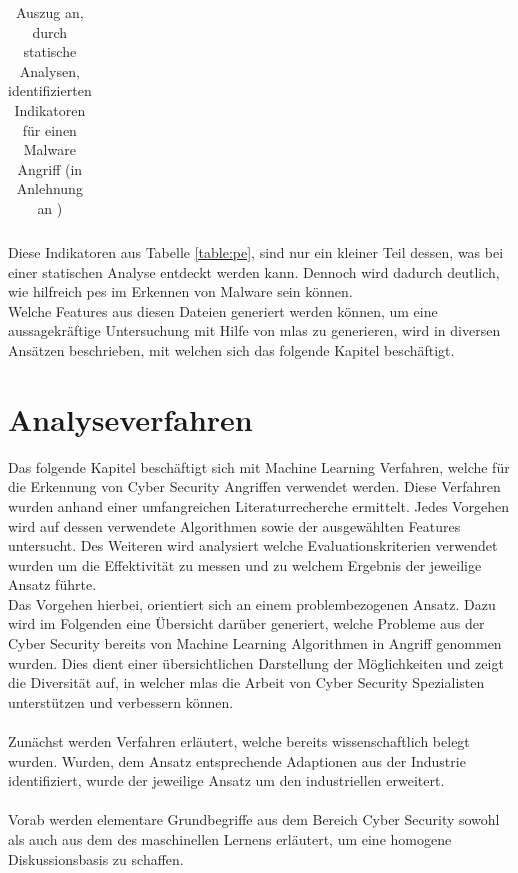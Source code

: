 \documentclass[
    12pt, %
    DIV10,
    ngerman, %
    a4paper, %
    oneside, %
    titlepage, %
    parskip=half, %
    headings=normal, %
    listof=totoc, %
    bibliography=totoc, %
    index=totoc, %
    captions=tableheading, %
    final %
]{scrreprt}
\begin{document}
\begin{table}[H]
\begin{tabular}{lll}
\end{tabular}
\caption{Auszug an, durch statische Analysen, identifizierten Indikatoren für einen Malware Angriff (in Anlehnung an \textcite{Sikorski2012})}\label{table:pe}
Diese Indikatoren aus Tabelle \ref{table:pe}, sind nur ein kleiner Teil dessen, was bei einer statischen Analyse entdeckt werden kann. Dennoch wird dadurch deutlich, wie hilfreich \ac{pes} im Erkennen von Malware sein können.\\ 
Welche Features aus diesen Dateien generiert werden können, um eine aussagekräftige Untersuchung mit Hilfe von \ac{mlas} zu generieren, wird in diversen Ansätzen beschrieben, mit welchen sich das folgende Kapitel beschäftigt.
\label{tab:iocs}
\end{table}
\chapter{Analyseverfahren}
\label{sec:ba}
Das folgende Kapitel beschäftigt sich mit Machine Learning Verfahren, welche für die Erkennung von Cyber Security Angriffen verwendet werden. Diese Verfahren wurden anhand einer umfangreichen Literaturrecherche ermittelt. Jedes Vorgehen wird auf dessen verwendete Algorithmen sowie der ausgewählten Features untersucht. Des Weiteren wird analysiert welche Evaluationskriterien verwendet wurden um die Effektivität zu messen und zu welchem Ergebnis der jeweilige Ansatz führte.\\
Das Vorgehen hierbei, orientiert sich an einem problembezogenen Ansatz. Dazu wird im Folgenden eine Übersicht darüber generiert, welche Probleme aus der Cyber Security bereits von Machine Learning Algorithmen in Angriff genommen wurden. Dies dient einer übersichtlichen Darstellung der Möglichkeiten und zeigt die Diversität auf, in welcher \ac{mlas} die Arbeit von Cyber Security Spezialisten unterstützen und verbessern können.\\\\
Zunächst werden Verfahren erläutert, welche bereits wissenschaftlich belegt wurden. Wurden, dem Ansatz entsprechende Adaptionen aus der Industrie identifiziert, wurde der jeweilige Ansatz um den industriellen erweitert.
\\\\
Vorab werden elementare Grundbegriffe aus dem Bereich Cyber Security sowohl als auch aus dem des maschinellen Lernens erläutert, um eine homogene Diskussionsbasis zu schaffen.
\end{document}
